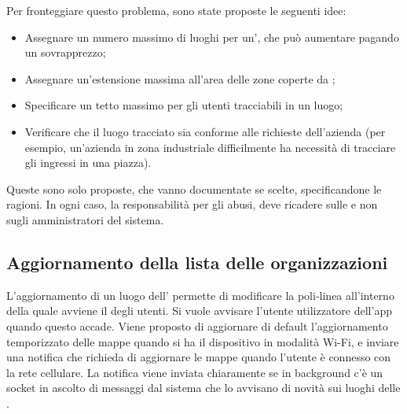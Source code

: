 Per fronteggiare questo problema, sono state proposte le seguenti idee:
\begin{itemize}
	\item Assegnare un numero massimo di luoghi per un', che può aumentare pagando un sovrapprezzo;
	\item Assegnare un'estensione massima all'area delle zone coperte da ;
	\item Specificare un tetto massimo per gli utenti tracciabili in un luogo;
	\item Verificare che il luogo tracciato sia conforme alle richieste dell'azienda (per esempio, un'azienda in zona industriale difficilmente ha necessità di tracciare gli ingressi in una piazza).
\end{itemize}
Queste sono solo proposte, che vanno documentate se scelte, specificandone le ragioni. In ogni caso, la responsabilità per gli abusi, deve ricadere sulle  e non sugli amministratori del sistema.

\subsection*{Aggiornamento della lista delle organizzazioni}
L'aggiornamento di un luogo dell' permette di modificare la poli-linea all'interno della quale avviene il  degli utenti. Si vuole avvisare l'utente utilizzatore dell'app quando questo accade.
Viene proposto di aggiornare di default l'aggiornamento temporizzato delle mappe quando si ha il dispositivo in modalità Wi-Fi, e inviare una notifica che richieda di aggiornare le mappe quando l'utente è connesso con la rete cellulare.
La notifica viene inviata chiaramente se in background c'è un socket  in ascolto di messaggi dal sistema che lo avvisano di novità sui luoghi delle .

\clearpage